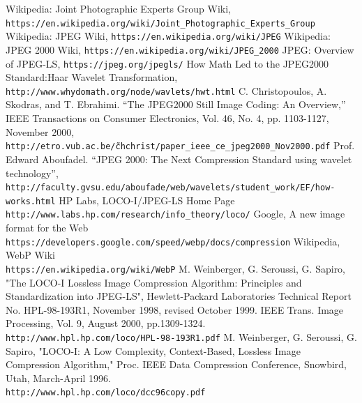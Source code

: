 \documentclass[UTF8, letterpaper, 14pt]{article}
\begin{document}
\begin{thebibliography}{9}
Wikipedia: Joint Photographic Experts Group Wiki,\\
\texttt{https://en.wikipedia.org/wiki/Joint\_Photographic\_Experts\_Group}
Wikipedia: JPEG Wiki,
\texttt{https://en.wikipedia.org/wiki/JPEG}
Wikipedia: JPEG 2000 Wiki,
\texttt{https://en.wikipedia.org/wiki/JPEG\_2000}
JPEG: Overview of JPEG-LS,
\texttt{https://jpeg.org/jpegls/}
How Math Led to the JPEG2000 Standard:Haar Wavelet Transformation,\\
\texttt{http://www.whydomath.org/node/wavlets/hwt.html}
C. Christopoulos, A. Skodras, and T. Ebrahimi.  “The JPEG2000 Still Image Coding: An Overview,” IEEE Transactions on Consumer Electronics, Vol. 46, No. 4, pp. 1103-1127, November 2000,\\
\texttt{http://etro.vub.ac.be/\~chchrist/paper\_ieee\_ce\_jpeg2000\_Nov2000.pdf}
Prof. Edward Aboufadel.  “JPEG 2000: The Next Compression Standard using wavelet technology”,\\
\texttt{http://faculty.gvsu.edu/aboufade/web/wavelets/student\_work/EF/how-works.html}
HP Labs, LOCO-I/JPEG-LS Home Page \\
\texttt{http://www.labs.hp.com/research/info\_theory/loco/}
Google, A new image format for the Web \\
\texttt{https://developers.google.com/speed/webp/docs/compression}
Wikipedia, WebP Wiki \\
\texttt{https://en.wikipedia.org/wiki/WebP}
M. Weinberger, G. Seroussi, G. Sapiro, "The LOCO-I Lossless Image Compression Algorithm: Principles and Standardization into JPEG-LS", Hewlett-Packard Laboratories Technical Report No. HPL-98-193R1, November 1998, revised October 1999.  IEEE Trans. Image Processing, Vol. 9, August 2000, pp.1309-1324. \\
\texttt{http://www.hpl.hp.com/loco/HPL-98-193R1.pdf}
M. Weinberger, G. Seroussi, G. Sapiro, "LOCO-I: A Low Complexity, Context-Based, Lossless Image Compression Algorithm," Proc. IEEE Data Compression Conference, Snowbird, Utah, March-April 1996. \\
\texttt{http://www.hpl.hp.com/loco/dcc96copy.pdf}
\end{thebibliography}
\end{document}
